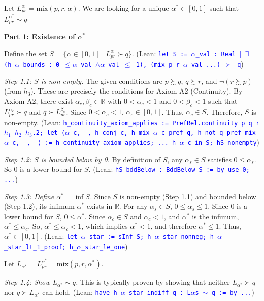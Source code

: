 \documentclass{article}
\theoremstyle{definition}
\newcommand{\R}{\mathbb{R}}
\newcommand{\tactic}[1]{\textcolor{blue}{\texttt{#1}}}
\newcommand{\pref}{\succsim} %
\newcommand{\strictpref}{\succ} %
\newcommand{\indiff}{\sim} %
\newcommand{\mix}{\mathrm{mix}} %
\begin{document}
Let $L_{pr}^\alpha = \mix(p, r, \alpha)$. We are looking for a unique $\alpha^* \in [0,1]$ such that $L_{pr}^{\alpha^*} \indiff q$.

\textbf{Part 1: Existence of $\alpha^*$}

Define the set $S = \{\alpha \in [0, 1] \mid L_{pr}^\alpha \strictpref q\}$.
(Lean: \tactic{let S := {$\alpha$\_val : Real $|$ $\exists$ (h\_$\alpha$\_bounds : 0 $\leq\alpha$\_val $\wedge\alpha$\_val $\leq$ 1), (mix p r $\alpha$\_val ...) $\succ$ q}})

\textit{Step 1.1: $S$ is non-empty.}
The given conditions are $p \pref q$, $q \pref r$, and $\lnot(r \pref p)$ (from $h_3$).
These are precisely the conditions for Axiom A2 (Continuity).
By Axiom A2, there exist $\alpha_c, \beta_c \in \R$ with $0 < \alpha_c < 1$ and $0 < \beta_c < 1$ such that $L_{pr}^{\alpha_c} \strictpref q$ and $q \strictpref L_{pr}^{\beta_c}$.
Since $0 < \alpha_c < 1$, $\alpha_c \in [0,1]$. Thus, $\alpha_c \in S$.
Therefore, $S$ is non-empty.
(Lean: \tactic{h\_continuity\_axiom\_applies := PrefRel.continuity p q r $h_1$ $h_2$ $h_3$.2; let ⟨$\alpha$\_c, \_, h\_conj\_c, h\_mix\_$\alpha$\_c\_pref\_q, h\_not\_q\_pref\_mix\_$\alpha$\_c, \_, \_⟩ := h\_continuity\_axiom\_applies; ... h\_$\alpha$\_c\_in\_S; hS\_nonempty})

\textit{Step 1.2: $S$ is bounded below by 0.}
By definition of $S$, any $\alpha_s \in S$ satisfies $0 \le \alpha_s$. So $0$ is a lower bound for $S$.
(Lean: \tactic{hS\_bddBelow : BddBelow S := by use 0; ...})

\textit{Step 1.3: Define $\alpha^* = \inf S$.}
Since $S$ is non-empty (Step 1.1) and bounded below (Step 1.2), its infimum $\alpha^*$ exists in $\R$.
For any $\alpha_s \in S$, $0 \le \alpha_s \le 1$.
Since $0$ is a lower bound for $S$, $0 \le \alpha^*$.
Since $\alpha_c \in S$ and $\alpha_c < 1$, and $\alpha^*$ is the infimum, $\alpha^* \le \alpha_c$.
So, $\alpha^* \le \alpha_c < 1$, which implies $\alpha^* < 1$, and therefore $\alpha^* \le 1$.
Thus, $\alpha^* \in [0,1]$.
(Lean: \tactic{let $\alpha$\_star := sInf S; h\_$\alpha$\_star\_nonneg; h\_$\alpha$\_star\_lt\_1\_proof; h\_$\alpha$\_star\_le\_one})

Let $L_{\alpha^*} = L_{pr}^{\alpha^*} = \mix(p, r, \alpha^*)$.

\textit{Step 1.4: Show $L_{\alpha^*} \indiff q$.}
This is typically proven by showing that neither $L_{\alpha^*} \strictpref q$ nor $q \strictpref L_{\alpha^*}$ can hold.
(Lean: \tactic{have h\_$\alpha$\_star\_indiff\_q : L$\alpha$s $\sim$ q := by ...})
\end{document}
